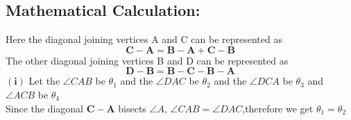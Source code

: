 \documentclass[a4paper,12pt,twocolumn]{article}
\let\vec\mathbf
\begin{document}
\subsection{Mathematical Calculation:}
Here the diagonal joining vertices A and C  can be represented as
\begin{equation}
\vec{C}-\vec{A} = \vec{B}-\vec{A}+\vec{C}-\vec{B}
\end{equation}
The other diagonal joining vertices B and D can be represented as
\begin{equation}
\vec{D-B} = \vec{B}-\vec{C}-\vec{B}-\vec{A}
\end{equation}
$\boldsymbol{(i)}$ Let the $\angle{CAB}$  be $\theta_1$ and the $\angle{DAC}$  be $\theta_2$ and the $\angle{DCA}$  be $\theta_3$ and $\angle{ACB}$ be $\theta_4$\\
Since the diagonal $\vec{C}-\vec{A}$ bisects $\angle{A}$, $\angle{CAB} = \angle{DAC}$,therefore we get $\theta_1=\theta_2$\\
\fi
\end{document}
